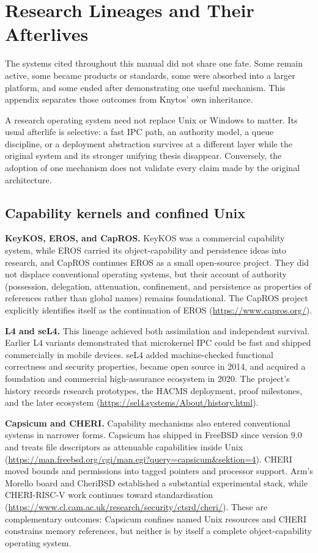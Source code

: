 \chapter{Research Lineages and Their Afterlives}
\label{app:research-afterlives}

The systems cited throughout this manual did not share one fate. Some remain
active, some became products or standards, some were absorbed into a larger
platform, and some ended after demonstrating one useful mechanism. This
appendix separates those outcomes from Knytos' own inheritance.

A research operating system need not replace Unix or Windows to matter. Its
usual afterlife is selective: a fast IPC path, an authority model, a queue
discipline, or a deployment abstraction survives at a different layer while
the original system and its stronger unifying thesis disappear. Conversely,
the adoption of one mechanism does not validate every claim made by the
original architecture.

\section{Capability kernels and confined Unix}

\textbf{KeyKOS, EROS, and CapROS.} KeyKOS was a commercial capability system, while
EROS carried its object-capability and persistence ideas into research, and
CapROS continues EROS as a small open-source project. They did not displace
conventional operating systems, but their account of authority (possession,
delegation, attenuation, confinement, and persistence as properties of
references rather than global names) remains foundational. The CapROS project
explicitly identifies itself as the continuation of EROS
(\url{https://www.capros.org/}).

\textbf{L4 and seL4.} This lineage achieved both assimilation and independent
survival. Earlier L4 variants demonstrated that microkernel IPC could be fast
and shipped commercially in mobile devices. seL4 added machine-checked
functional correctness and security properties, became open source in 2014,
and acquired a foundation and commercial high-assurance ecosystem in 2020.
The project's history records research prototypes, the HACMS deployment, proof
milestones, and the later ecosystem
(\url{https://sel4.systems/About/history.html}).

\textbf{Capsicum and CHERI.} Capability mechanisms also entered conventional
systems in narrower forms. Capsicum has shipped in FreeBSD since version 9.0
and treats file descriptors as attenuable capabilities inside Unix
(\url{https://man.freebsd.org/cgi/man.cgi?query=capsicum&sektion=4}). CHERI
moved bounds and permissions into tagged pointers and processor support. Arm's
Morello board and CheriBSD established a substantial experimental stack, while
CHERI-RISC-V work continues toward standardisation
(\url{https://www.cl.cam.ac.uk/research/security/ctsrd/cheri/}). These are
complementary outcomes: Capsicum confines named Unix resources and CHERI
constrains memory references, but neither is by itself a complete object-capability
operating system.

